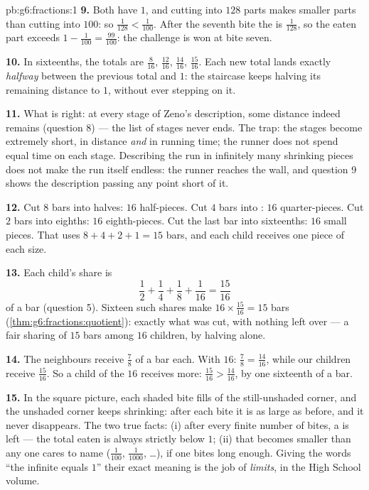 \begin{solution}{pb:g6:fractions:1}
\textbf{9.} Both  have  $1$, and cutting into
$128$ parts makes smaller parts than cutting into $100$: so
$\frac{1}{128} < \frac{1}{100}$. After the seventh bite the
 is $\frac{1}{128}$, so the eaten part exceeds
$1 - \frac{1}{100} = \frac{99}{100}$: the challenge is won at
bite seven.

\textbf{10.} In sixteenths, the totals are $\frac{8}{16}$,
$\frac{12}{16}$, $\frac{14}{16}$, $\frac{15}{16}$. Each new total
lands exactly \emph{halfway} between the previous total and $1$:
the staircase keeps halving its remaining distance to $1$,
without ever stepping on it.

\textbf{11.} What is right: at every stage of Zeno's description,
some distance indeed remains (question 8) --- the list of stages
never ends. The trap: the stages become extremely short, in
distance \emph{and} in running time; the runner does not spend
equal time on each stage. Describing the run in infinitely many
shrinking pieces does not make the run itself endless: the
runner reaches the wall, and question 9 shows the description
passing any point short of it.

\textbf{12.} Cut $8$ bars into halves: $16$ half-pieces. Cut $4$
bars into : $16$ quarter-pieces. Cut $2$ bars into
eighths: $16$ eighth-pieces. Cut the last bar into sixteenths:
$16$ small pieces. That uses $8 + 4 + 2 + 1 = 15$ bars, and each
child receives one piece of each size.

\textbf{13.} Each child's share is
\[
\frac12 + \frac14 + \frac18 + \frac{1}{16} = \frac{15}{16}
\]
of a bar (question 5). Sixteen such shares make
$16 \times \frac{15}{16} = 15$ bars
(\cref{thm:g6:fractions:quotient}): exactly what was cut, with
nothing left over --- a fair sharing of $15$ bars among $16$
children, by halving alone.

\textbf{14.} The neighbours receive $\frac78$ of a bar each. With
 $16$: $\frac78 = \frac{14}{16}$, while our children
receive $\frac{15}{16}$. So a child of the $16$ receives more:
$\frac{15}{16} > \frac{14}{16}$, by one sixteenth of a bar.

\textbf{15.} In the square picture, each shaded bite fills 
of the still-unshaded corner, and the unshaded corner keeps
shrinking: after each bite it is  as large as before, and it
never disappears. The two true facts: (i) after every finite
number of bites, a  is left --- the total eaten is
always strictly below $1$; (ii) that  becomes smaller
than any  one cares to name ($\frac{1}{100}$,
$\frac{1}{1000}$, \dots), if one bites long enough. Giving the
words ``the infinite  equals $1$'' their exact meaning is the
job of \emph{limits}, in the High School volume.
\end{solution}
